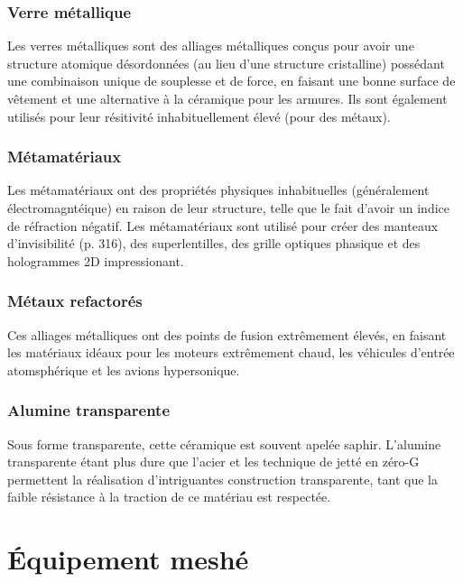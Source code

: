 \subsubsection{Verre métallique} 

Les verres métalliques sont des alliages métalliques conçus pour avoir une structure atomique désordonnées (au lieu d'une structure cristalline) possédant une combinaison unique de souplesse et de force, en faisant une bonne surface de vêtement et une alternative à la céramique pour les armures. Ils sont également utilisés pour leur résitivité inhabituellement élevé (pour des métaux). 

\subsubsection{Métamatériaux} 

Les métamatériaux ont des propriétés physiques inhabituelles (généralement électromagntéique) en raison de leur structure, telle que le fait d'avoir un indice de réfraction négatif. Les métamatériaux sont utilisé pour créer des manteaux d'invisibilité (p. 316), des superlentilles, des grille optiques phasique et des hologrammes 2D impressionant. 

\subsubsection{Métaux refactorés} 

Ces alliages métalliques ont  des points de fusion extrêmement élevés, en faisant les matériaux idéaux pour les moteurs extrêmement chaud, les véhicules d'entrée atomsphérique et les avions hypersonique. 

\subsubsection{Alumine transparente} 

Sous forme transparente, cette céramique est souvent apelée saphir. L'alumine transparente étant plus dure que l'acier et les technique de jetté en zéro-G permettent la réalisation d'intriguantes construction transparente, tant que la faible résistance à la traction de ce matériau est respectée. 

\section{Équipement meshé} \label{sec:meshed-gear} 


